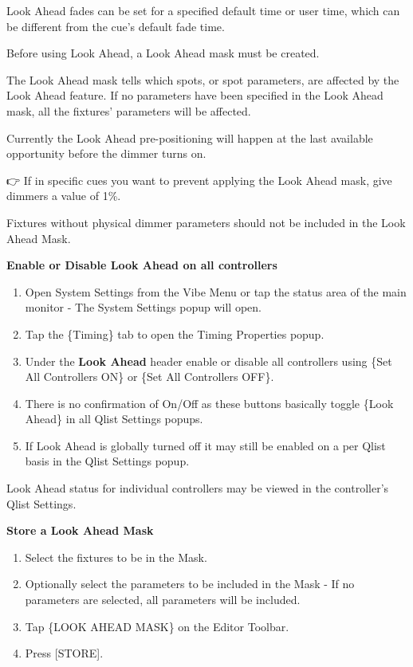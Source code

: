 \documentclass[
]{article}
\begin{document}
Look Ahead fades can be set for a specified default time or user time, which can be different from the cue's default fade time.

Before using Look Ahead, a Look Ahead mask must be created.

The Look Ahead mask tells which spots, or spot parameters, are affected by the Look Ahead feature. If no parameters have been specified in the Look Ahead mask, all the fixtures' parameters will be affected.

Currently the Look Ahead pre-positioning will happen at the last available opportunity before the dimmer turns on.

👉 If in specific cues you want to prevent applying the Look Ahead mask, give dimmers a value of 1\%.

{Fixtures without physical dimmer parameters should not be included in the Look Ahead Mask.}

\textbf{Enable or Disable Look Ahead on all controllers}

\begin{enumerate}
\def\labelenumi{\arabic{enumi}.}
\item
  Open System Settings from the Vibe Menu or tap the status area of the main monitor - The System Settings popup will open.
\item
  Tap the \{Timing\} tab to open the Timing Properties popup.
\item
  Under the \textbf{Look Ahead} header enable or disable all controllers using \{Set All Controllers ON\} or \{Set All Controllers OFF\}.
\item
  There is no confirmation of On/Off as these buttons basically toggle \{Look Ahead\} in all Qlist Settings popups.
\item
  If Look Ahead is globally turned off it may still be enabled on a per Qlist basis in the Qlist Settings popup.
\end{enumerate}

Look Ahead status for individual controllers may be viewed in the controller's Qlist Settings.

\textbf{Store a Look Ahead Mask}

\begin{enumerate}
\def\labelenumi{\arabic{enumi}.}
\item
  Select the fixtures to be in the Mask.
\item
  Optionally select the parameters to be included in the Mask - If no parameters are selected, all parameters will be included.
\item
  Tap \{LOOK AHEAD MASK\} on the Editor Toolbar.
\item
  Press {[}STORE{]}.
\end{enumerate}
\end{document}
